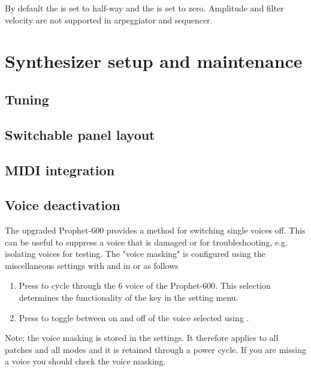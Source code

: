\documentclass[landscape, 11pt, oneside, twoside]{report}
\newenvironment{flowtext}{\addmargin[0cm]{0cm}}{\endaddmargin} %
\begin{document}
\begin{flowtext}
By default the \ampvel is set to half-way and the \filvel is set to zero. Amplitude and filter velocity are not supported in arpeggiator and sequencer.

\pagebreak


\chapter{Synthesizer setup and maintenance}\label{maintenance}

\section{Tuning}\label{tuning}



\section{Switchable panel layout}\label{panelswitch}



\section{MIDI integration}\label{midiintegration}



\section{Voice deactivation}

The upgraded Prophet-600 provides a method for switching single voices off. This can be useful to suppress a voice that is damaged or for troubleshooting, e.g. isolating voices for testing. The "voice masking" is configured using the miscellaneous settings with  and  in \shiftmode or \shiftlock as follows
\begin{enumerate}
  \setlength\itemsep{0cm}
  \item Press  to cycle through the 6 voice of the Prophet-600. This selection determines the functionality of the key  in the setting menu.
  \item Press  to toggle between on and off of the voice selected using . 
\end{enumerate}

Note: the voice masking is stored in the settings. It therefore applies to all patches and all modes and it is retained through a power cycle. If you are missing a voice you should check the voice masking.


\end{flowtext}
\end{document}
